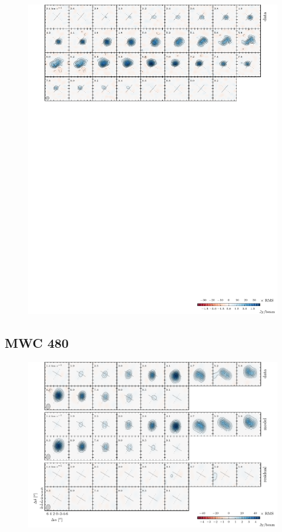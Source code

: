 \documentclass[twocolumn]{aastex6}
\begin{document}
\begin{figure}[htb]
\begin{center}
  \includegraphics{GMAur.pdf}
  \end{center}
\end{figure}


\subsection{MWC 480}
\begin{figure}[htb]
\begin{center}
  \includegraphics{MWC480.pdf}
  \end{center}
\end{figure}
\end{document}
